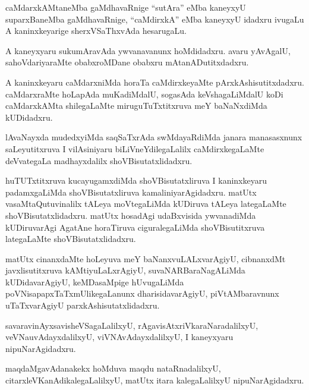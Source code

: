 \documentclass{article}
\begin{document}
\begin{mn}
caMdarxkAMtaneMba gaMdhavaRnige ``sutAra'' eMba kaneyxyU suparxBaneMba gaMdhavaRnige, ``caMdirxkA''
eMba kaneyxyU idadxru ivugaLu A kaninxkeyarige sherxVSaThxvAda hesarugaLu.
\end{mn}

\begin{mn}
A kaneyxyaru sukumAravAda ywvanavanunx hoMdidadxru. avaru yAvAgalU, sahoVdariyaraMte obabxroMDane 
obabxru mAtanADutitxdadxru.
\end{mn}

\begin{mn}
A kaninxkeyaru caMdarxniMda horaTa caMdirxkeyaMte pArxkAshisutitxdadxru. caMdarxraMte hoLapAda 
muKadiMdalU, sogasAda keVshagaLiMdalU koDi caMdarxkAMta shilegaLaMte miruguTuTxtitxruva meY 
baNaNxdiMda kUDidadxru.
\end{mn}

\begin{mn}
lAvaNayxda mudedxyiMda saqSaTxrAda swMdayaRdiMda janara manasasxnunx saLeyutitxruva I 
vilAsiniyaru biLiVneYdilegaLalilx  caMdirxkegaLaMte deVvategaLa madhayxdalilx shoVBisutatxlidadxru.
\end{mn}

\begin{mn}
huTUTxtitxruva kucayugamxdiMda shoVBisutatxliruva I kaninxkeyaru padamxgaLiMda  
shoVBisutatxliruva kamaliniyarAgidadxru. matUtx vasaMtaQutuvinalilx tALeya moVtegaLiMda kUDiruva
tALeya lategaLaMte shoVBisutatxlidadxru. matUtx hosadAgi udaBxvisida ywvanadiMda kUDiruvarAgi 
AgatAne horaTiruva ciguralegaLiMda shoVBisutitxruva lategaLaMte shoVBisutatxlidadxru.
\end{mn}

\begin{mn}
matUtx cinanxdaMte hoLeyuva meY baNanxvuLALxvarAgiyU, cibnanxdMt javxlisutitxruva kAMtiyuLaLxrAgiyU,
suvaNARBaraNagALiMda kUDidavarAgiyU, keMDasaMpige hUvugaLiMda poVNisapapxTaTxmUlikegaLanunx 
dharisidavarAgiyU, piVtAMbaravnunx uTaTxvarAgiyU parxkAshisutatxlidadxru.
\end{mn}

\begin{mn}
savaravinAyxsavisheVSagaLalilxyU, rAgavisAtxriVkaraNaradalilxyU, veVNauvAdayxdalilxyU, 
viVNAvAdayxdalilxyU, I kaneyxyaru nipuNarAgidadxru.
\end{mn}

\begin{mn}
maqdaMgavAdanakekx hoMduva maqdu nataRnadalilxyU, citarxleVKanAdikalegaLalilxyU, matUtx itara 
kalegaLalilxyU nipuNarAgidadxru.
\end{mn}
\end{document}
